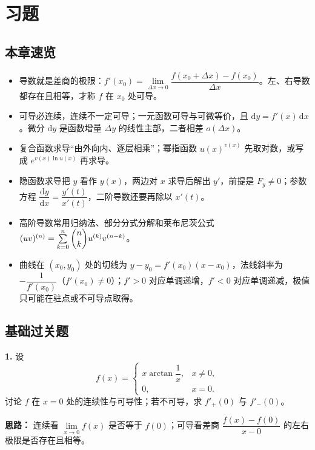 \section{习题}

\subsection{本章速览}

\begin{itemize}[leftmargin=2em,itemsep=2pt]
  \item 导数就是差商的极限：$f'(x_0)=\lim\limits_{\Delta x\to0}\dfrac{f(x_0+\Delta x)-f(x_0)}{\Delta x}$。左、右导数都存在且相等，才称 $f$ 在 $x_0$ 处可导。
  \item 可导必连续，连续不一定可导；一元函数可导与可微等价，且 $\mathrm{d}y=f'(x)\,\mathrm{d}x$。微分 $\mathrm{d}y$ 是函数增量 $\Delta y$ 的线性主部，二者相差 $o(\Delta x)$。
  \item 复合函数求导“由外向内、逐层相乘”；幂指函数 $u(x)^{v(x)}$ 先取对数，或写成 $e^{v(x)\ln u(x)}$ 再求导。
  \item 隐函数求导把 $y$ 看作 $y(x)$，两边对 $x$ 求导后解出 $y'$，前提是 $F_y\ne0$；参数方程 $\dfrac{\mathrm{d}y}{\mathrm{d}x}=\dfrac{y'(t)}{x'(t)}$，二阶导数还要再除以 $x'(t)$。
  \item 高阶导数常用归纳法、部分分式分解和莱布尼茨公式 $(uv)^{(n)}=\sum\limits_{k=0}^{n}\dbinom{n}{k}u^{(k)}v^{(n-k)}$。
  \item 曲线在 $(x_0,y_0)$ 处的切线为 $y-y_0=f'(x_0)(x-x_0)$，法线斜率为 $-\dfrac{1}{f'(x_0)}$（$f'(x_0)\ne0$）；$f'>0$ 对应单调递增，$f'<0$ 对应单调递减，极值只可能在驻点或不可导点取得。
\end{itemize}

\subsection{基础过关题}

\textbf{1.} 设
\[
f(x)=\begin{cases}
x\arctan\dfrac{1}{x}, & x\ne 0,\\[6pt]
0, & x=0.
\end{cases}
\]
讨论 $f$ 在 $x=0$ 处的连续性与可导性；若不可导，求 $f'_+(0)$ 与 $f'_-(0)$。

\ifshowsolutions%

\textbf{思路：} 连续看 $\lim\limits_{x\to0}f(x)$ 是否等于 $f(0)$；可导看差商 $\dfrac{f(x)-f(0)}{x-0}$ 的左右极限是否存在且相等。

